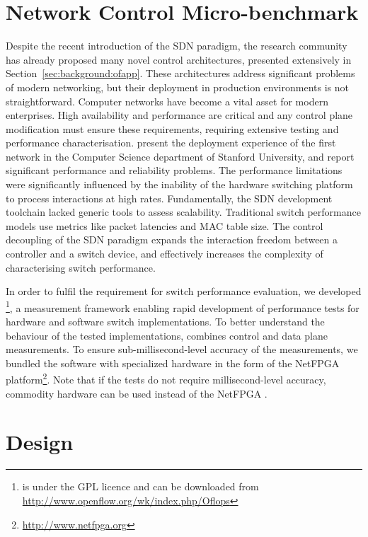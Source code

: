 \section{Network Control Micro-benchmark} \label{sec:oflops-intro}

Despite the recent introduction of the SDN paradigm, the research community has
already proposed many novel control architectures, presented
extensively in Section~\ref{sec:background:ofapp}. These architectures address
significant problems of modern networking, but their deployment in production
environments is not straightforward.  Computer networks have become a vital asset
for modern enterprises.  High availability and performance are critical and any
control plane modification must ensure these requirements, requiring extensive
testing and performance characterisation.   present the
deployment experience of the first \of network in the Computer
Science department of Stanford University, and report significant performance and
reliability problems.  The performance limitations were significantly
influenced by the inability of the hardware switching platform to process \of
interactions at high rates.  Fundamentally, the SDN development toolchain lacked
generic tools to assess \of scalability.  Traditional switch performance models
use metrics like packet latencies and MAC table size. The control decoupling of
the SDN paradigm expands the interaction freedom between a controller and a
switch device, and effectively increases the complexity of characterising switch
performance. 

In order to fulfil the requirement for \of switch performance evaluation, we
developed \oflops\footnote{\oflops is under the GPL licence and can be
  downloaded from \url{http://www.openflow.org/wk/index.php/Oflops}}, a
measurement framework enabling rapid development of performance tests for
hardware and software \of switch implementations. To better understand the
behaviour of the tested \of implementations, \oflops combines
\of control and data plane measurements. To ensure
sub-millisecond-level accuracy of the measurements, we bundled the \oflops
software with specialized hardware in the form of the NetFPGA
platform\footnote{\url{http://www.netfpga.org}}.  Note that if the tests do not
require millisecond-level accuracy, commodity hardware can be used instead of
the NetFPGA .

\section{\oflops Design}\label{sec:oflops-design}

